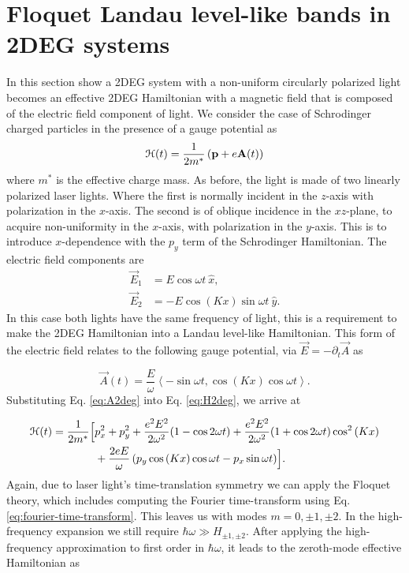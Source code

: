 \section{Floquet Landau level-like bands in 2DEG systems}
In this section show a 2DEG system with a non-uniform circularly polarized light becomes an effective 2DEG Hamiltonian with a magnetic field that is composed of the electric field component of light.
We consider the case of Schrodinger charged particles in the presence of a gauge potential as
\begin{equation}\label{eq:H2deg}
  \mathcal{H}(t) = \dfrac{1}{2m^*} \left( \mathbf{p} + e \mathbf{A}(t)\right)
\end{equation}
where $m^*$ is the effective charge mass.
As before, the light is made of two linearly polarized laser lights.
Where the first is normally incident in the $z$-axis with polarization in the $x$-axis.
The second is of oblique incidence in the $xz$-plane, to acquire non-uniformity in the $x$-axis, with polarization in the $y$-axis.
This is to introduce $x$-dependence with the $p_y$ term of the Schrodinger Hamiltonian.
The electric field components are
\begin{align} \label{eq:E2field}
  \vec{E}_{1} &= E \cos{\omega t}\ \hat{x}, \nonumber \\
  \vec{E}_{2} &= -E\cos{(K x)} \sin{\omega t}\ \hat{y}.
\end{align}%
In this case both lights have the same frequency of light, this is a requirement to make the 2DEG Hamiltonian into a Landau level-like Hamiltonian.
This form of the electric field relates to the following gauge potential, via $\vec{E} = -\partial_t \vec{A}$ as

\begin{equation}\label{eq:A2deg}
  \vec{A}(t)= \dfrac{E}{\omega} \left\langle -\sin \omega t, \cos{(Kx)} \cos{\omega t} \right\rangle.
\end{equation}%
Substituting Eq. \eqref{eq:A2deg} into Eq. \eqref{eq:H2deg}, we arrive at

\begin{align}\label{eq:H2time}
  \mathcal{H}(t) = \dfrac{1}{2m^*} \Bigl[ &p_x^2 + p_y^2 + \dfrac{e^2 E^2}{2\omega^2}(1-\cos{2\omega t}) + \dfrac{e^2 E^2}{2\omega^2}(1+\cos{2\omega t}) \cos^2{(Kx)} \nonumber \\
  &+\dfrac{2eE}{\omega} \left(p_y \cos{(Kx)}\cos{\omega t} -  p_x \sin{\omega t}\right) \Bigr].
\end{align}
Again, due to laser light's time-translation symmetry we can apply the Floquet theory, which includes computing the Fourier time-transform using Eq. \eqref{eq:fourier-time-transform}.
This leaves us with modes $m=0,\pm1,\pm2$.
In the high-frequency expansion we still require $\hbar \omega \gg H_{\pm1,\pm2}$.
After applying the high-frequency approximation to first order in $\hbar \omega$, it leads to the zeroth-mode effective Hamiltonian as


